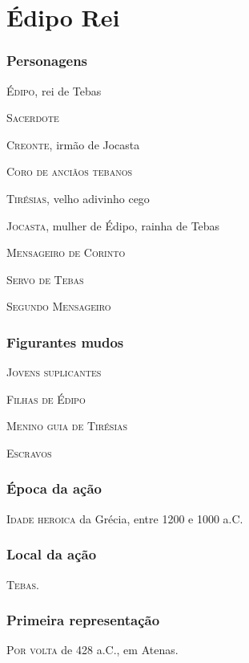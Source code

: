 
\part{Édipo Rei}
\paginabranca

\section{Personagens}

\textsc{Édipo,} rei de Tebas

\textsc{Sacerdote}

\textsc{Creonte,} irmão de Jocasta

\textsc{Coro de anciãos tebanos}

\textsc{Tirésias,} velho adivinho cego

\textsc{Jocasta,} mulher de Édipo, rainha de Tebas

\textsc{Mensageiro de Corinto}

\textsc{Servo de Tebas}

\textsc{Segundo Mensageiro}


\section{Figurantes mudos} 

\textsc{Jovens suplicantes} 

\textsc{Filhas de Édipo}

\textsc{Menino guia de Tirésias}

\textsc{Escravos}



\section{Época da ação} 

\textsc{Idade heroica} da Grécia, entre 1200 e 1000 a.C.

\section{Local da ação} 

\textsc{Tebas}.

\section{Primeira representação} 

\textsc{Por volta} de 428 a.C., em Atenas.


